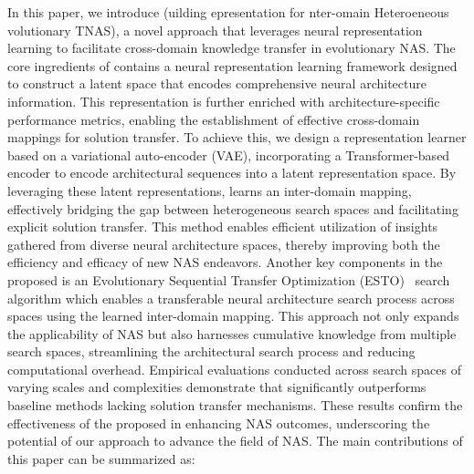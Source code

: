 \documentclass[../main.tex]{subfiles}
\begin{document}
In this paper, we introduce \OUR{} (uilding epresentation for nter-omain Heteroeneous volutionary TNAS), a novel approach that leverages neural representation learning to facilitate cross-domain knowledge transfer in evolutionary NAS\@. The core ingredients of \OUR{} contains a neural representation learning framework designed to construct a latent space that encodes comprehensive neural architecture information. This representation is further enriched with architecture-specific performance metrics, enabling the establishment of effective cross-domain mappings for solution transfer.
To achieve this, we design a representation learner based on a variational auto-encoder (VAE), incorporating a Transformer-based encoder to encode architectural sequences into a latent representation space.
By leveraging these latent representations, \OUR{} learns an inter-domain mapping, effectively bridging the gap between heterogeneous search spaces and facilitating explicit solution transfer. This method enables efficient utilization of insights gathered from diverse neural architecture spaces, thereby improving both the efficiency and efficacy of new NAS endeavors.
Another key components in the proposed \OUR{} is an Evolutionary Sequential Transfer Optimization (ESTO)~\cite{DBLP:journals/cim/TanFJ21,DBLP:journals/tec/XueYHZCST22,10342789} search algorithm which enables a transferable neural architecture search process across spaces using the learned inter-domain mapping. This approach not only expands the applicability of NAS but also harnesses cumulative knowledge from multiple search spaces, streamlining the architectural search process and reducing computational overhead.
Empirical evaluations conducted across search spaces of varying scales and complexities demonstrate that \OUR{} significantly outperforms baseline methods lacking solution transfer mechanisms.
These results confirm the effectiveness of the proposed \OUR{} in enhancing NAS outcomes, underscoring the potential of our approach to advance the field of NAS\@.
The main contributions of this paper can be summarized as:
\end{document}
